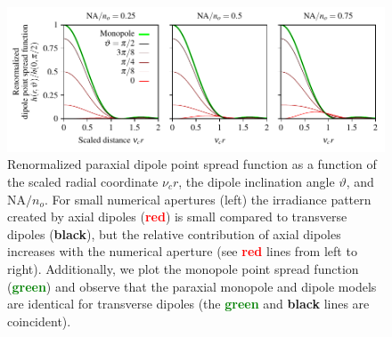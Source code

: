 \documentclass[]{osa-article}
\begin{document}
\begin{figure}[h]
 \centering
   \centering
   \includegraphics[scale=0.8]{../figures/paratfs/dpsf.pdf}
   \caption{Renormalized paraxial dipole point spread function as a function of
     the scaled radial coordinate $\nu_c r$, the dipole inclination angle
     $\vartheta$, and $\text{NA}/n_o$. For small numerical apertures (left) the
     irradiance pattern created by axial dipoles (\textcolor{red}{\textbf{red}})
     is small compared to transverse dipoles (\textbf{black}), but the relative
     contribution of axial dipoles increases with the numerical aperture (see
     \textcolor{red}{\textbf{red}} lines from left to right). Additionally, we
     plot the monopole point spread function (\textcolor{green}{\textbf{green}})
     and observe that the paraxial monopole and dipole models are identical for
     transverse dipoles (the \textcolor{green}{\textbf{green}} and
     \textbf{black} lines are coincident).}
   \label{fig:hdet}
 \end{figure}
 
\end{document}
